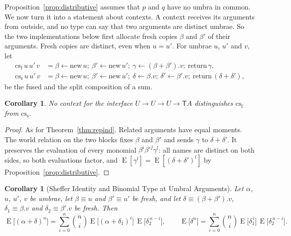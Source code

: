 \documentclass[11pt,a4paper]{report}
\theoremstyle{plain}
\newtheorem{corollary}[theorem]{Corollary}
\theoremstyle{definition}
\theoremstyle{remark}
\newcommand{\E}{\operatorname{E}}
\newcommand{\T}{\mathsf{T}}
\begin{document}
Proposition~\ref{prop:distributive} assumes that $p$ and $q$ have no umbra in
common. We now turn it into a statement about contexts. A context receives its
arguments from outside, and no type can say that two arguments are distinct
umbrae. So the two implementations below first allocate fresh copies $\beta$ and
$\beta'$ of their arguments. Fresh copies are distinct, even when $u = u'$. For
umbrae $u$, $u'$ and $v$, let
\[
  \begin{aligned}
    \mathrm{cs}_{\mathrm{f}}\, u\, u'\, v &= \beta \leftarrow \mathrm{new}\, u;\
      \beta' \leftarrow \mathrm{new}\, u';\ \gamma \leftarrow (\beta + \beta').v;\
      \mathrm{return}\, \gamma , \\
    \mathrm{cs}_{\mathrm{s}}\, u\, u'\, v &= \beta \leftarrow \mathrm{new}\, u;\
      \beta' \leftarrow \mathrm{new}\, u';\ \delta \leftarrow \beta.v;\
      \delta' \leftarrow \beta'.v;\ \mathrm{return}\, (\delta + \delta') ,
  \end{aligned}
\]
be the fused and the split composition of a sum.

\begin{corollary}
\label{cor:repind-compose}
No context for the interface $U \to U \to U \to \T A$ distinguishes
$\mathrm{cs}_{\mathrm{f}}$ from $\mathrm{cs}_{\mathrm{s}}$.
\end{corollary}

\begin{proof}
As for Theorem~\ref{thm:repind}. Related arguments have equal moments. The world
relation on the two blocks fixes $\beta$ and $\beta'$ and sends $\gamma$ to
$\delta + \delta'$. It preserves the evaluation of every monomial
$\beta^i \beta'^j \gamma^l$: all names are distinct on both sides, so both
evaluations factor, and $\E[\gamma^l] = \E[(\delta + \delta')^l]$ by
Proposition~\ref{prop:distributive}.
\end{proof}

\begin{corollary}[Sheffer Identity and Binomial Type at Umbral Arguments]
\label{cor:sheffer}
Let $\alpha$, $u$, $u'$, $v$ be umbrae, let $\beta \equiv u$ and
$\beta' \equiv u'$ be fresh, and let $\delta \equiv (\beta + \beta').v$,
$\delta_1 \equiv \beta.v$ and $\delta_2 \equiv \beta'.v$ be fresh. Then
\[
  \E\bigl[(\alpha + \delta)^n\bigr]
    = \sum_{i=0}^{n} \binom{n}{i} \E\bigl[(\alpha + \delta_1)^i\bigr]\,
      \E\bigl[\delta_2^{\,n-i}\bigr] ,
  \qquad
  \E\bigl[\delta^n\bigr]
    = \sum_{i=0}^{n} \binom{n}{i} \E\bigl[\delta_1^{\,i}\bigr]\, \E\bigl[\delta_2^{\,n-i}\bigr] .
\]
\end{corollary}
\end{document}

